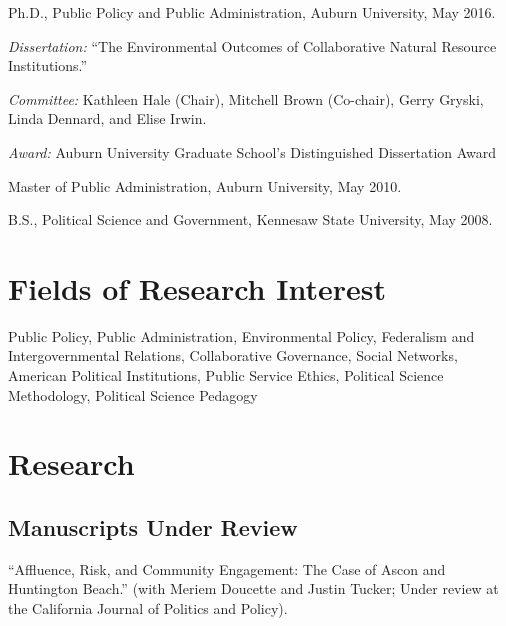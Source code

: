 \documentclass[11pt,letterpaper]{article}
\renewenvironment{itemize}{
  \begin{list}{}{
    \setlength{\leftmargin}{1.5em}
    \setlength{\itemsep}{0.25em}
    \setlength{\parskip}{0pt}
    \setlength{\parsep}{0.25em}
  }
}{
  \end{list}
}
\begin{document}
\begin{itemize}
  \item Ph.D., Public Policy and Public Administration, Auburn University, May 2016.
    \begin{itemize}\leftmargin=2pt\itemindent=-15pt
    \item \emph{Dissertation:} ``The Environmental Outcomes of Collaborative Natural Resource Institutions.'' 
    \item \emph{Committee:} Kathleen Hale (Chair), Mitchell Brown (Co-chair),
	Gerry Gryski, \\Linda Dennard, and Elise Irwin.
	\item \emph{Award:} Auburn University Graduate School's Distinguished Dissertation Award
    \end{itemize}
  \item Master of Public Administration, Auburn University, May 2010.
  \item B.S., Political Science and Government, Kennesaw State University, May 2008.
\end{itemize}

\section*{Fields of Research Interest}

Public Policy, Public Administration, Environmental Policy, Federalism and Intergovernmental Relations, Collaborative Governance, Social Networks, American Political Institutions, Public Service Ethics, Political Science Methodology, Political Science Pedagogy

\section*{Research}

\subsection*{Manuscripts Under Review}

\begin{itemize}\leftmargin=2pt\itemindent=-15pt
	\item ``Affluence, Risk, and Community Engagement: The Case of Ascon and Huntington Beach.'' (with Meriem Doucette and Justin Tucker; Under review at the California Journal of Politics and Policy).
\end{itemize}
\end{document}
